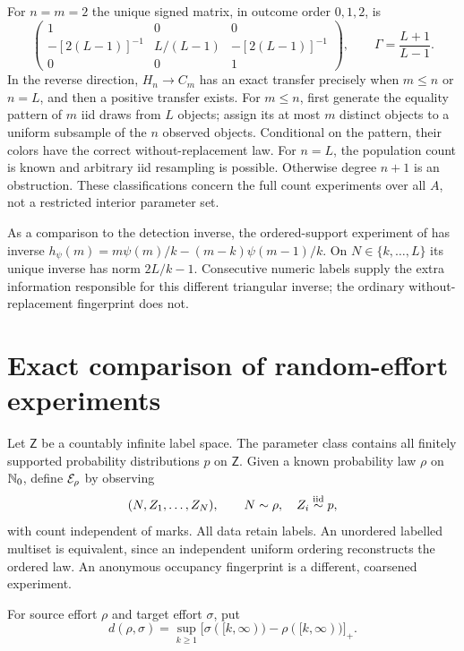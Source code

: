 \documentclass[11pt]{article}
\numberwithin{equation}{section}
\theoremstyle{definition}
\theoremstyle{remark}
\begin{document}
For $n=m=2$ the unique signed matrix, in outcome order $0,1,2$, is
\begin{equation}\label{eq:crosssigned}
 \begin{pmatrix}
 1&0&0\\
 -[2(L-1)]^{-1}&L/(L-1)&-[2(L-1)]^{-1}\\
 0&0&1
 \end{pmatrix},\qquad \Gamma=\frac{L+1}{L-1}.
\end{equation}
In the reverse direction, $H_n\to C_m$ has an exact transfer precisely when $m\le n$ or $n=L$, and then a positive transfer exists. For $m\le n$, first generate the equality pattern of $m$ iid draws from $L$ objects; assign its at most $m$ distinct objects to a uniform subsample of the $n$ observed objects. Conditional on the pattern, their colors have the correct without-replacement law. For $n=L$, the population count is known and arbitrary iid resampling is possible. Otherwise degree $n+1$ is an obstruction. These classifications concern the full count experiments over all $A$, not a restricted interior parameter set.

As a comparison to the detection inverse, the ordered-support experiment of \cite[Proposition 10.1]{LongI} has inverse $h_\psi(m)=m\psi(m)/k-(m-k)\psi(m-1)/k$. On $N\in\{k,\ldots,L\}$ its unique inverse has norm $2L/k-1$. Consecutive numeric labels supply the extra information responsible for this different triangular inverse; the ordinary without-replacement fingerprint does not.

\section{Exact comparison of random-effort experiments}\label{sec:effort}
Let $\mathsf Z$ be a countably infinite label space. The parameter class contains all finitely supported probability distributions $p$ on $\mathsf Z$. Given a known probability law $\rho$ on $\mathbb N_0$, define $\mathcal E_\rho$ by observing
\[
 (N,Z_1,\ldots,Z_N),\qquad N\sim\rho,\quad Z_i\overset{\rm iid}{\sim}p,
\]
with count independent of marks. All data retain labels. An unordered labelled multiset is equivalent, since an independent uniform ordering reconstructs the ordered law. An anonymous occupancy fingerprint is a different, coarsened experiment.

For source effort $\rho$ and target effort $\sigma$, put
\begin{equation}\label{eq:tailgap}
 d(\rho,\sigma)=\sup_{k\ge1}\bigl[\sigma([k,\infty))-\rho([k,\infty))\bigr]_+.
\end{equation}
\end{document}
